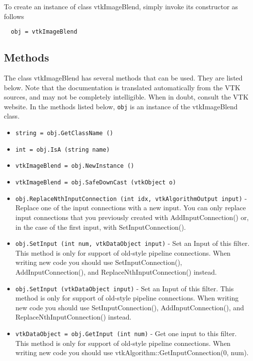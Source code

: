 To create an instance of class vtkImageBlend, simply
invoke its constructor as follows
\begin{verbatim}
  obj = vtkImageBlend
\end{verbatim}
\subsection{Methods}

The class vtkImageBlend has several methods that can be used.
  They are listed below.
Note that the documentation is translated automatically from the VTK sources,
and may not be completely intelligible.  When in doubt, consult the VTK website.
In the methods listed below, \verb|obj| is an instance of the vtkImageBlend class.
\begin{itemize}
\item  \verb|string = obj.GetClassName ()|

\item  \verb|int = obj.IsA (string name)|

\item  \verb|vtkImageBlend = obj.NewInstance ()|

\item  \verb|vtkImageBlend = obj.SafeDownCast (vtkObject o)|

\item  \verb|obj.ReplaceNthInputConnection (int idx, vtkAlgorithmOutput input)| -  Replace one of the input connections with a new input.  You can
 only replace input connections that you previously created with
 AddInputConnection() or, in the case of the first input,
 with SetInputConnection().

\item  \verb|obj.SetInput (int num, vtkDataObject input)| -  Set an Input of this filter.  This method is only for support of
 old-style pipeline connections.  When writing new code you should
 use SetInputConnection(), AddInputConnection(), and
 ReplaceNthInputConnection() instead.

\item  \verb|obj.SetInput (vtkDataObject input)| -  Set an Input of this filter.  This method is only for support of
 old-style pipeline connections.  When writing new code you should
 use SetInputConnection(), AddInputConnection(), and
 ReplaceNthInputConnection() instead.

\item  \verb|vtkDataObject = obj.GetInput (int num)| -  Get one input to this filter. This method is only for support of
 old-style pipeline connections.  When writing new code you should
 use vtkAlgorithm::GetInputConnection(0, num).


\end{itemize}
